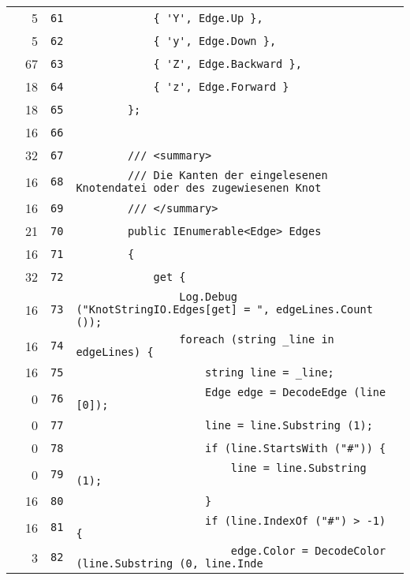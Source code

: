 \documentclass[a4paper,10pt]{article}
\begin{document}
\begin{longtable}[l]{lrrl}
\cellcolor{green} & 5 & \verb~61~ & \verb~            { 'Y', Edge.Up },~\\
\cellcolor{green} & 5 & \verb~62~ & \verb~            { 'y', Edge.Down },~\\
\cellcolor{green} & 67 & \verb~63~ & \verb~            { 'Z', Edge.Backward },~\\
\cellcolor{green} & 18 & \verb~64~ & \verb~            { 'z', Edge.Forward }~\\
\cellcolor{green} & 18 & \verb~65~ & \verb~        };~\\
\cellcolor{green} & 16 & \verb~66~ & \verb~~\\
\cellcolor{green} & 32 & \verb~67~ & \verb~        /// <summary>~\\
\cellcolor{green} & 16 & \verb~68~ & \verb~        /// Die Kanten der eingelesenen Knotendatei oder des zugewiesenen Knot~\\
\cellcolor{green} & 16 & \verb~69~ & \verb~        /// </summary>~\\
\cellcolor{green} & 21 & \verb~70~ & \verb~        public IEnumerable<Edge> Edges~\\
\cellcolor{green} & 16 & \verb~71~ & \verb~        {~\\
\cellcolor{green} & 32 & \verb~72~ & \verb~            get {~\\
\cellcolor{green} & 16 & \verb~73~ & \verb~                Log.Debug ("KnotStringIO.Edges[get] = ", edgeLines.Count ());~\\
\cellcolor{green} & 16 & \verb~74~ & \verb~                foreach (string _line in edgeLines) {~\\
\cellcolor{green} & 16 & \verb~75~ & \verb~                    string line = _line;~\\
\cellcolor{red} & 0 & \verb~76~ & \verb~                    Edge edge = DecodeEdge (line [0]);~\\
\cellcolor{red} & 0 & \verb~77~ & \verb~                    line = line.Substring (1);~\\
\cellcolor{red} & 0 & \verb~78~ & \verb~                    if (line.StartsWith ("#")) {~\\
\cellcolor{red} & 0 & \verb~79~ & \verb~                        line = line.Substring (1);~\\
\cellcolor{green} & 16 & \verb~80~ & \verb~                    }~\\
\cellcolor{green} & 16 & \verb~81~ & \verb~                    if (line.IndexOf ("#") > -1) {~\\
\cellcolor{green} & 3 & \verb~82~ & \verb~                        edge.Color = DecodeColor (line.Substring (0, line.Inde~\\

\end{longtable}
\end{document}
